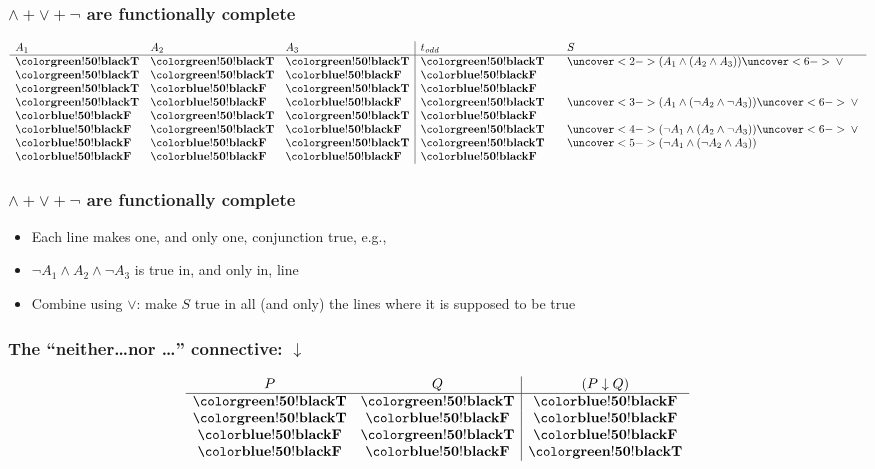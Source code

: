 \begin{frame}
  \frametitle{$\land + \lor + \lnot$ are functionally complete}
\[
\begin{array}{lll|l@{\qquad}l}
A_1 & A_2 & A_3 & t_\mathit{odd} & S \\
\hline
\True & \True & \True & \True & \uncover<2->{(A_1 \land (A_2 \land A_3))} \uncover<6->{{}\lor{}}\\
\True & \True & \False & \False \\
\True & \False & \True & \False \\
\True & \False & \False & \True & \uncover<3->{(A_1 \land (\lnot A_2 \land \lnot A_3))} \uncover<6->{{}\lor{}}\\
\False & \True & \True & \False \\
\False & \True & \False & \True & \uncover<4->{(\lnot A_1 \land (A_2 \land \lnot A_3))} \uncover<6->{{}\lor{}}\\
\False & \False & \True & \True & \uncover<5->{(\lnot A_1 \land (\lnot A_2 \land A_3))}\\
\False & \False & \False & \False
\end{array}\]
\end{frame}

\begin{frame}
  \frametitle{$\land + \lor + \lnot$ are functionally complete}

\begin{itemize}[<+->]
\item Each line makes one, and only one, conjunction true, e.g.,
\item $\lnot A_1 \land A_2 \land \lnot A_3$ is true in, and only in, line \False\ \True\ \False
\item Combine using $\lor$: make $S$ true in all (and only) the lines where it is supposed to be true
\end{itemize}
\end{frame}

\begin{frame}
    \frametitle{The ``neither\dots nor \dots'' connective: $\downarrow$}

\[
\begin{array}{cc|c}
P & Q & (P \downarrow Q)\\
\hline
\True & \True & \False\\
\True & \False & \False\\
\False & \True & \False\\
\False & \False & \True
\end{array}
\]

\end{frame}

